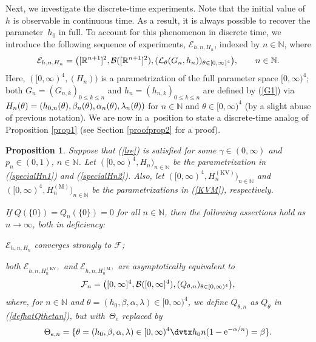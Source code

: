 \documentclass[number,citesort,seceqn,dvips]{arxbj}
\newcommand{\eqref}[1]{(\ref{#1})}
\newtheorem{proposition}{Proposition}[section]
\newcommand{\RR}{\mathbb{R}}
\newcommand{\NN}{\mathbb{N}}
\newcommand{\BBB}{{\mathcal B}}
\newcommand{\EEE}{{\mathcal E}}
\newcommand{\FFF}{{\mathcal F}}
\newcommand{\LLL}{{\mathcal L}}
\begin{document}
Next, we investigate the discrete-time experiments. Note that the
initial value of $h$ is observable in continuous time. As a result, it
is always possible to recover the parameter~$h_0$ in full. To account
for this phenomenon in discrete time, we introduce the following
sequence of experiments, $\EEE_{h,n,H_n}$, indexed by $n\in\NN$, where\vspace*{-2pt}
%
\begin{equation}\label{experimentsh2}
\EEE_{h,n,H_n} =  \bigl([\RR^{n + 1}]^2,\BBB([\RR^{n + 1}]^2),
 (\LLL_{\theta} (G_n,h_n ) )_{\theta\in[0,\infty
)^4} \bigr),\qquad n\in\NN .\vspace*{-2pt}
\end{equation}
%
Here, $([0,\infty)^4,(H_n))$ is a parametrization of the full parameter
space $[0,\infty)^4$; both $G_n=(G_{n,k})_{0\le k\le n}$
and $h_n=(h_{n,k})_{0\le k\le n}$ are defined by \eqref{G1} via
$H_n(\theta)=(h_{0,n}(\theta),\beta_n(\theta),\alpha_n(\theta
),\break\lambda_n(\theta))$
for $n\in\NN$ and $\theta\in[0,\infty)^4$ (by a slight abuse of
previous notation). We are now in a~position to state a discrete-time
analog of Proposition \ref{prop1} (see Section \ref{proofprop2} for a
proof).

\begin{proposition}\label{prop2}Suppose that \eqref{lre} is
satisfied for some $\gamma\in(0,\infty)$ and $p_n\in(0,1)$, $n\in
\NN$.
Let $([0,\infty)^4,H_n)_{n\in\NN}$ be the parametrization in
\eqref{specialHn1} and \eqref{specialHn2}. Also, let
$([0,\infty)^4,\allowbreak H_n^{\mathrm{(KV)}})_{n\in\NN}$ and
$([0,\infty)^4,H_n^{\mathrm{(M)}})_{n\in\NN}$ be the parametrizations in
\eqref{KVM}, respectively.

If $Q(\{0\})=Q_n(\{0\})=0$ for all $n\in\NN$, then the following
assertions hold as $n\to\infty$, both in deficiency:
\begin{longlist}
\item   $\EEE_{h,n,H_n}$ converges strongly to
$\FFF$;
\item   both $\EEE_{h,n,H_n^{\mathrm{(KV)}}}$ and $\EEE_{h,n,H_n^{\mathrm{(M)}}}$ are
asymptotically equivalent to\vspace*{-2pt}
%
\[
\FFF_{n}= \bigl([0,\infty]^4,\BBB([0,\infty]^4),
(Q_{\theta,n})_{\theta\in[0,\infty)^4} \bigr),\vspace*{-2pt}
\]
%
where, for $n\in\NN$ and
$\theta=(h_0,\beta,\alpha,\lambda)\in[0,\infty)^4$, we define
$Q_{\theta,n}$ as $Q_{\theta}$ in \eqref{defhatQthetan}, but with~$\Theta_e$ replaced by\vspace*{-2pt}
%
\[
\Theta_{e,n} = \{\theta=(h_0,\beta,\alpha,\lambda)\in[0,\infty
)^4\dvtx
h_0 n (1 - \mathrm{e}^{-\alpha/n})=\beta\} .\vspace*{-2pt}
\]
\end{longlist}
\end{proposition}
\end{document}
